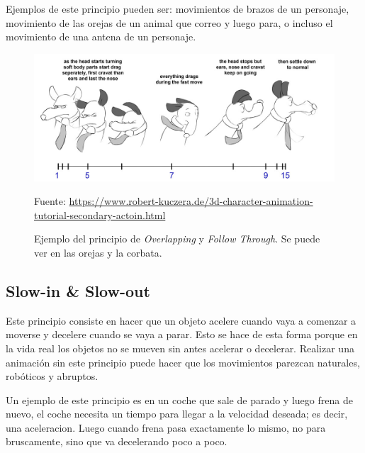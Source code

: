 \documentclass{article}
\begin{document}
\bigskip

Ejemplos de este principio pueden ser: movimientos de brazos de un personaje, movimiento de las orejas de un animal que correo y luego para, o incluso el movimiento de una antena de un personaje.

\begin{figure}[H]
    \centering
    \includegraphics[width=\textwidth]{imagenes/overlap-08.jpg}
    \caption{Ejemplo del principio de \textit{Overlapping} y \textit{Follow Through}. Se puede ver en las orejas y la corbata.}
    \vspace{10pt}
    \footnotesize{Fuente: \url{https://www.robert-kuczera.de/3d-character-animation-tutorial-secondary-actoin.html}}
\end{figure}

\subsection{Slow-in \& Slow-out}


Este principio consiste en hacer que un objeto acelere cuando vaya a comenzar a moverse y decelere cuando se vaya a parar. Esto se hace de esta forma porque en la vida real los objetos no se mueven sin antes acelerar o decelerar. Realizar una animación sin este principio puede hacer que los movimientos parezcan naturales, robóticos y abruptos. \cite{plural}

\bigskip

Un ejemplo de este principio es en un coche que sale de parado y luego frena de nuevo, el coche necesita un tiempo para llegar a la velocidad deseada; es decir, una aceleracion. Luego cuando frena pasa exactamente lo mismo, no para bruscamente, sino que va decelerando poco a poco. \cite{plural}
\end{document}
